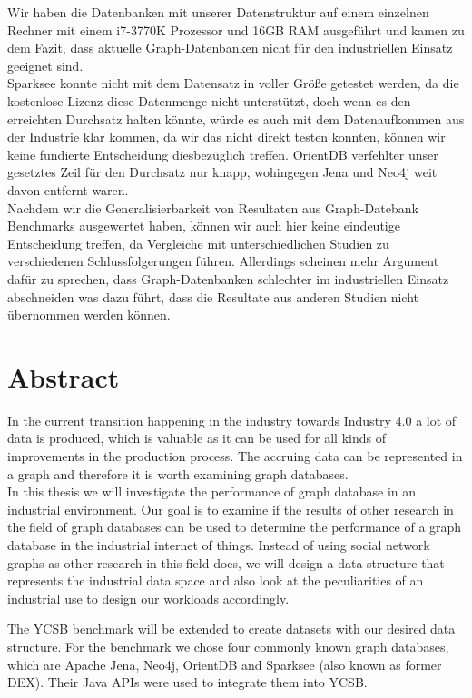 Wir haben die Datenbanken mit unserer Datenstruktur auf einem einzelnen Rechner mit einem i7-3770K Prozessor und 16GB RAM ausgeführt und kamen zu dem Fazit,
dass aktuelle Graph-Datenbanken nicht für den industriellen Einsatz geeignet sind.\\
Sparksee konnte nicht mit dem Datensatz in voller Größe getestet werden,
da die kostenlose Lizenz diese Datenmenge nicht unterstützt,
doch wenn es den erreichten Durchsatz halten könnte,
würde es auch mit dem Datenaufkommen aus der Industrie klar kommen,
da wir das nicht direkt testen konnten,
können wir keine fundierte Entscheidung diesbezüglich treffen.
OrientDB verfehlter unser gesetztes Zeil für den Durchsatz nur knapp,
wohingegen Jena und Neo4j weit davon entfernt waren.\\
Nachdem wir die Generalisierbarkeit von Resultaten aus Graph-Datebank Benchmarks ausgewertet haben,
können wir auch hier keine eindeutige Entscheidung treffen,
da Vergleiche mit unterschiedlichen Studien zu verschiedenen Schlussfolgerungen führen.
Allerdings scheinen mehr Argument dafür zu sprechen,
dass Graph-Datenbanken schlechter im industriellen Einsatz abschneiden was dazu führt,
dass die Resultate aus anderen Studien nicht übernommen werden können.

\cleardoublepage

\chapter*{Abstract}

In the current transition happening in the industry towards Industry 4.0 a lot of data is produced,
which is valuable as it can be used for all kinds of improvements in the production process.
The accruing data can be represented in a graph and therefore it is worth examining graph databases.\\
In this thesis we will investigate the performance of graph database in an industrial environment.
Our goal is to examine if the results of other research in the field of graph databases can be used to determine the performance of a graph database in the industrial internet of things.
Instead of using social network graphs as other research in this field does,
we will design a data structure that represents the industrial data space and also look at the peculiarities of an industrial use to design our workloads accordingly.

The YCSB benchmark will be extended to create datasets with our desired data structure.
For the benchmark we chose four commonly known graph databases, which are Apache Jena, Neo4j, OrientDB and Sparksee (also known as former DEX).
Their Java APIs were used to integrate them into YCSB.

